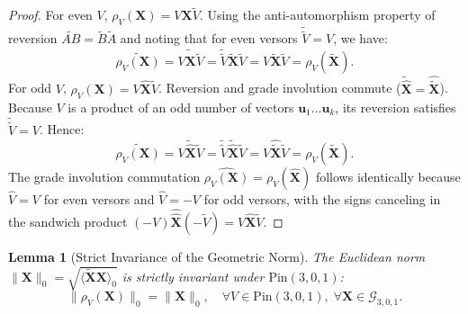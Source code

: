 \documentclass[10pt]{article}
\newtheorem{lemma}{Lemma}
\begin{document}
\begin{proof}
For even $V$, $\rho_V(\mathbf{X}) = V \mathbf{X} \widetilde{V}$. Using the anti-automorphism property of reversion $\widetilde{A B} = \widetilde{B} \widetilde{A}$ and noting that for even versors $\widetilde{\widetilde{V}} = V$, we have:
\begin{equation}
    \widetilde{\rho_V(\mathbf{X})} = \widetilde{V \mathbf{X} \widetilde{V}} = \widetilde{\widetilde{V}} \widetilde{\mathbf{X}} \widetilde{V} = V \widetilde{\mathbf{X}} \widetilde{V} = \rho_V(\widetilde{\mathbf{X}}).
\end{equation}
For odd $V$, $\rho_V(\mathbf{X}) = V \widehat{\mathbf{X}} \widetilde{V}$. Reversion and grade involution commute ($\widetilde{\widehat{\mathbf{X}}} = \widehat{\widetilde{\mathbf{X}}}$). Because $V$ is a product of an odd number of vectors $\mathbf{u}_1 \dots \mathbf{u}_k$, its reversion satisfies $\widetilde{\widetilde{V}} = V$. Hence:
\begin{equation}
    \widetilde{\rho_V(\mathbf{X})} = \widetilde{V \widehat{\mathbf{X}} \widetilde{V}} = \widetilde{\widetilde{V}} \widetilde{\widehat{\mathbf{X}}} \widetilde{V} = V \widehat{\widetilde{\mathbf{X}}} \widetilde{V} = \rho_V(\widetilde{\mathbf{X}}).
\end{equation}
The grade involution commutation $\widehat{\rho_V(\mathbf{X})} = \rho_V(\widehat{\mathbf{X}})$ follows identically because $\widehat{V} = V$ for even versors and $\widehat{V} = -V$ for odd versors, with the signs canceling in the sandwich product $(-V)\widehat{\widehat{\mathbf{X}}}(-\widetilde{V}) = V \widehat{\mathbf{X}} \widetilde{V}$.
\end{proof}

\begin{lemma}[Strict Invariance of the Geometric Norm]
\label{lem:norm_invariance}
The Euclidean norm $\|\mathbf{X}\|_0 = \sqrt{\langle \widetilde{\mathbf{X}} \mathbf{X} \rangle_0}$ is strictly invariant under $\mathrm{Pin}(3,0,1)$:
\begin{equation}
    \|\rho_V(\mathbf{X})\|_0 = \|\mathbf{X}\|_0, \quad \forall V \in \mathrm{Pin}(3,0,1), \; \forall \mathbf{X} \in \mathcal{G}_{3,0,1}.
\end{equation}
\end{lemma}
\end{document}
